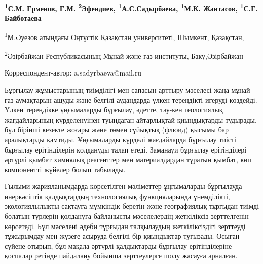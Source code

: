 
\begin{articleheader}


{\bfseries \textsuperscript{1}С.М. Ерменов, Г.М.
\textsuperscript{2}Эфендиев,
\textsuperscript{1}А.С.Садырбаева\textsuperscript{\envelope },
\textsuperscript{1}М.К. Жантасов, \textsuperscript{1}С.Е. Байботаева}
\end{articleheader}
\begin{affiliation}

\textsuperscript{1}М.Әуезов атындағы Оңтүстік Қазақстан университеті,
Шымкент, Қазақстан,

\textsuperscript{2}Әзірбайжан Республикасының Мұнай және газ институты,
Баку,Әзірбайжан

\raggedright {\bfseries \textsuperscript{\envelope }}Корреспондент-автор: a.sadyrbaeva@mail.ru
\end{affiliation}

Бұрғылау жұмыстарының тиімділігі мен сапасын арттыру мәселесі жаңа
мұнай-газ аумақтарын ашуды және белгілі аудандарда үлкен тереңдікті
игеруді көздейді. Үлкен тереңдікке ұңғымаларды бұрғылау, әдетте, тау-кен
геологиялық жағдайларының күрделенуінен туындаған айтарлықтай
қиындықтарды тудырады, бұл бірінші кезекте жоғары және төмен сұйықтық
(флюид) қысымы бар аралықтарды қамтиды. Ұңғымаларды күрделі жағдайларда
бұрғылау тиісті бұрғылау ерітінділерін қолдануды талап етеді. Заманауи
бұрғылау ерітінділері әртүрлі қымбат химиялық реагенттер мен
материалдардан тұратын қымбат, көп компонентті жүйелер болып табылады.

Ғылыми жарияланымдарда көрсетілген мәліметтер ұңғымаларды бұрғылауда
өнеркәсіптік қалдықтардың технологиялық функцияларында үнемділікті,
экологиялылықты сақтауға мүмкіндік беретін және географиялық тұрғыдан
тиімді болатын түрлерін қолдануға байланысты мәселелердің жеткіліксіз
зерттелгенін көрсетеді. Бұл мәселені әдеби тұрғыдан талқылаудың
жеткіліксіздігі зерттеуді тұжырымдау мен жүзеге асыруда белгілі бір
қиындықтар туғызады. Осыған сүйене отырып, бұл мақала әртүрлі
қалдықтарды бұрғылау ерітінділеріне қоспалар ретінде пайдалану бойынша
зерттеулерге шолу жасауға арналған.


